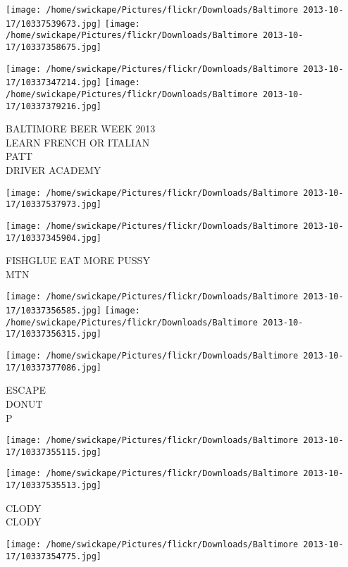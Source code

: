 \documentclass[10pt,letterpaper]{article}
\begin{document}
\texttt{[image: /home/swickape/Pictures/flickr/Downloads/Baltimore 2013-10-17/10337539673.jpg]}
\texttt{[image: /home/swickape/Pictures/flickr/Downloads/Baltimore 2013-10-17/10337358675.jpg]}

\texttt{[image: /home/swickape/Pictures/flickr/Downloads/Baltimore 2013-10-17/10337347214.jpg]}
\texttt{[image: /home/swickape/Pictures/flickr/Downloads/Baltimore 2013-10-17/10337379216.jpg]}

BALTIMORE BEER WEEK 2013\\
LEARN FRENCH OR ITALIAN\\
PATT\\
DRIVER ACADEMY\\
\pagebreak

\texttt{[image: /home/swickape/Pictures/flickr/Downloads/Baltimore 2013-10-17/10337537973.jpg]}

\vspace{0.25in}
\texttt{[image: /home/swickape/Pictures/flickr/Downloads/Baltimore 2013-10-17/10337345904.jpg]}

FISHGLUE EAT MORE PUSSY\\
MTN\\
\pagebreak

\texttt{[image: /home/swickape/Pictures/flickr/Downloads/Baltimore 2013-10-17/10337356585.jpg]}
\texttt{[image: /home/swickape/Pictures/flickr/Downloads/Baltimore 2013-10-17/10337356315.jpg]}

\vspace{0.25in}
\texttt{[image: /home/swickape/Pictures/flickr/Downloads/Baltimore 2013-10-17/10337377086.jpg]}

ESCAPE\\
DONUT\\
P\\
\pagebreak

\texttt{[image: /home/swickape/Pictures/flickr/Downloads/Baltimore 2013-10-17/10337355115.jpg]}

\vspace{0.25in}
\texttt{[image: /home/swickape/Pictures/flickr/Downloads/Baltimore 2013-10-17/10337535513.jpg]}

CLODY\\
CLODY\\
\pagebreak

\texttt{[image: /home/swickape/Pictures/flickr/Downloads/Baltimore 2013-10-17/10337354775.jpg]}
\end{document}
